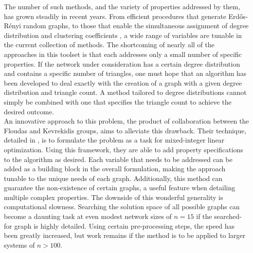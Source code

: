 \documentclass[11pt]{article}
\begin{document}
\indent The number of such methods, and the variety of properties addressed by them, has grown steadily in recent years. From efficient procedures that generate Erd\H{o}s-R\'{e}nyi random graphs, to those that enable the simultaneous assignment of degree distribution and clustering coefficients \cite{Batagelj2005} \cite{Deijfen2009}, a wide range of variables are tunable in the current collection of methods. The shortcoming of nearly all of the approaches in this toolset is that each addresses only a small number of specific properties. If the network under consideration has a certain degree distribution and contains a specific number of triangles, one must hope that an algorithm has been developed to deal exactly with the creation of a graph with a given degree distribution and triangle count. A method tailored to degree distributions cannot simply be combined with one that specifies the triangle count to achieve the desired outcome. \vspace{1mm}\\
\indent An innovative approach to this problem, the product of collaboration between the Floudas and Kevrekidis groups, aims to alleviate this drawback. Their technique, detailed in \cite{Gounaris2013}, is to formulate the problem as a task for mixed-integer linear optimization. Using this framework, they are able to add property specifications to the algorithm as desired. Each variable that needs to be addressed can be added as a building block in the overall formulation, making the approach tunable to the unique needs of each graph. Additionally, this method can guarantee the non-existence of certain graphs, a useful feature when detailing multiple complex properties. The downside of this wonderful generality is computational slowness. Searching the solution space of all possible graphs can become a daunting task at even modest network sizes of $n=15$ if the searched-for graph is highly detailed. Using certain pre-processing steps, the speed has been greatly increased, but work remains if the method is to be applied to larger systems of $n>100$. 
\end{document}
